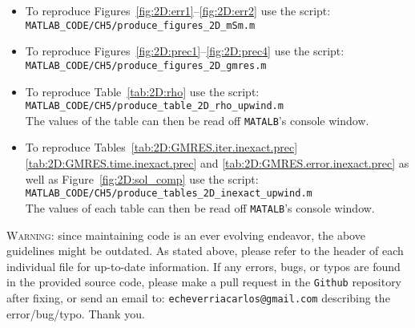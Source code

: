 \documentclass[
  twoside,
  BCOR=12mm,
  openany,
]{scrbook} %
\begin{document}
\begin{itemize}
\item To reproduce Figures~\ref{fig:2D:err1}--\ref{fig:2D:err2} use the script:\\
\medskip
\texttt{MATLAB\_CODE/CH5/produce\_figures\_2D\_mSm.m}
\item To reproduce Figures~\ref{fig:2D:prec1}--\ref{fig:2D:prec4} use the script:\\
\medskip
\texttt{MATLAB\_CODE/CH5/produce\_figures\_2D\_gmres.m}
\item To reproduce Table~\ref{tab:2D:rho} use the script:\\
\medskip
\texttt{MATLAB\_CODE/CH5/produce\_table\_2D\_rho\_upwind.m}\\
The values of the table can then be read off \texttt{MATALB}'s console window.
\item To reproduce Tables~\ref{tab:2D:GMRES.iter.inexact.prec} \ref{tab:2D:GMRES.time.inexact.prec} and \ref{tab:2D:GMRES.error.inexact.prec} as well as Figure~\ref{fig:2D:sol_comp} use the script:\\
\medskip
\texttt{MATLAB\_CODE/CH5/produce\_tables\_2D\_inexact\_upwind.m}\\
The values of each table can then be read off \texttt{MATALB}'s console window.
\end{itemize}

\noindent \textsc{Warning}: since maintaining code is an ever evolving endeavor, the above guidelines might be outdated. As stated above, please refer to the header of each individual file for up-to-date information. If any errors, bugs, or typos are found in the provided source code, please make a pull request in the \texttt{Github} repository after fixing, or send an email to: \texttt{echeverriacarlos@gmail.com} describing the error/bug/typo. Thank you.
%
\fi

\setlength{\emergencystretch}{0.7em}
\printbibliography[heading=bibintoc]{}
\end{document}
